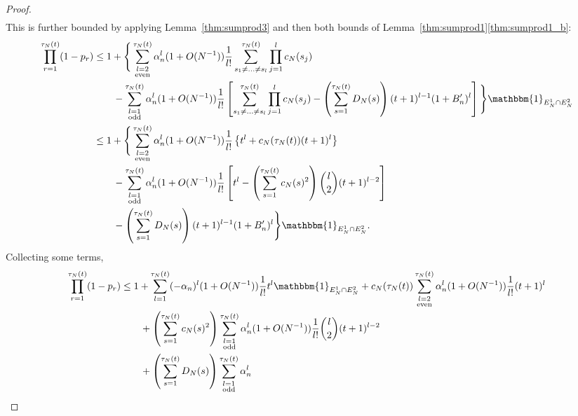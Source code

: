 \documentclass{article}
\newcommand{\1}[1]{\mathbbm{1}_{#1}}
\begin{document}
\begin{proof}
\begin{align}
        \label{eq:019}
\end{align}
This is further bounded by applying Lemma~\ref{thm:sumprod3} and then both bounds of Lemma~\ref{thm:sumprod1}\ref{thm:sumprod1_b}:
\begin{align}
\prod_{r=1}^{\tau_N(t)} (1-p_r)
&\leq 1 + \Bigg\{ \sum_{\substack{l=2 \\ \text{even} }}^{\tau_N(t)} 
        \alpha_n^l (1+O(N^{-1})) \frac{1}{l!} 
        \sum_{s_1\neq\dots\neq s_l}^{\tau_N(t)}\prod_{j=1}^l c_N(s_j)
        \notag\\
    &\qquad- \sum_{\substack{l=1 \\ \text{odd} }}^{\tau_N(t)} 
        \alpha_n^l (1+O(N^{-1})) \frac{1}{l!} 
        \left[ \sum_{s_1\neq\dots\neq s_l}^{\tau_N(t)}\prod_{j=1}^l c_N(s_j)
        - \left( \sum_{s=1}^{\tau_N(t)} D_N(s) \right) 
        (t+1)^{l-1} (1+B_n^\prime)^l \right] \Bigg\} \1{E_N^1 \cap E_N^2} \notag\\
&\leq 1 + \Bigg\{ \sum_{\substack{l=2 \\ \text{even} }}^{\tau_N(t)} 
        \alpha_n^l (1+O(N^{-1})) \frac{1}{l!} 
        \left\{ t^l + c_N(\tau_N(t)) (t+1)^l \right\} \notag\\
    &\qquad- \sum_{\substack{l=1 \\ \text{odd} }}^{\tau_N(t)} 
        \alpha_n^l (1+O(N^{-1})) \frac{1}{l!} 
        \left[ t^l - \left( \sum_{s=1}^{\tau_N(t)} c_N(s)^2 \right) 
        \binom{l}{2} (t+1)^{l-2} \right] \notag\\
    &\qquad- \left( \sum_{s=1}^{\tau_N(t)} D_N(s) \right) 
        (t+1)^{l-1} (1+B_n^\prime)^l \Bigg\} \1{E_N^1 \cap E_N^2} .
\end{align}
Collecting some terms,
\begin{align}
\prod_{r=1}^{\tau_N(t)} (1-p_r)
&\leq 1+ \sum_{l=1}^{\tau_N(t)} (-\alpha_n)^l (1+O(N^{-1})) \frac{1}{l!} t^l 
        \1{E_N^1 \cap E_N^2}
        + c_N(\tau_N(t)) \sum_{\substack{l=2 \\ \text{even} }}^{\tau_N(t)}
        \alpha_n^l (1+O(N^{-1})) \frac{1}{l!} (t+1)^l \notag\\
    &\qquad+ \left( \sum_{s=1}^{\tau_N(t)} c_N(s)^2 \right)
        \sum_{\substack{l=1 \\ \text{odd} }}^{\tau_N(t)} \alpha_n^l
        (1+O(N^{-1})) \frac{1}{l!} \binom{l}{2} (t+1)^{l-2} \notag\\
    &\qquad+ \left( \sum_{s=1}^{\tau_N(t)} D_N(s) \right) 
        \sum_{\substack{l=1 \\ \text{odd} }}^{\tau_N(t)} \alpha_n^l

\end{align}
\end{proof}
\end{document}
